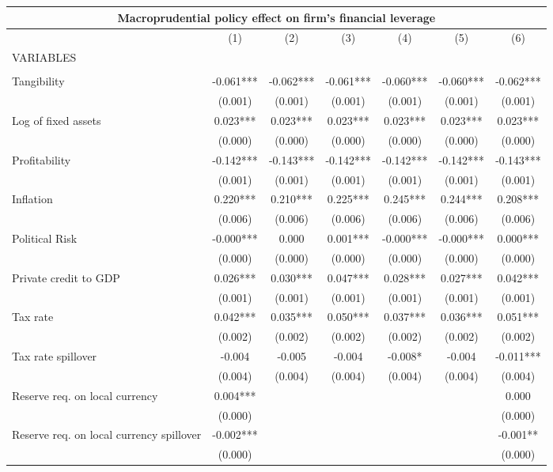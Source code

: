 \begin{tabular}{lcccccc}
\multicolumn{7}{c}{Macroprudential policy effect on firm's financial leverage} \\ \hline
 & (1) & (2) & (3) & (4) & (5) & (6) \\
VARIABLES &  &  &  &  &  &  \\ \hline
 &  &  &  &  &  &  \\
Tangibility & -0.061*** & -0.062*** & -0.061*** & -0.060*** & -0.060*** & -0.062*** \\
 & (0.001) & (0.001) & (0.001) & (0.001) & (0.001) & (0.001) \\
Log of fixed assets & 0.023*** & 0.023*** & 0.023*** & 0.023*** & 0.023*** & 0.023*** \\
 & (0.000) & (0.000) & (0.000) & (0.000) & (0.000) & (0.000) \\
Profitability & -0.142*** & -0.143*** & -0.142*** & -0.142*** & -0.142*** & -0.143*** \\
 & (0.001) & (0.001) & (0.001) & (0.001) & (0.001) & (0.001) \\
Inflation & 0.220*** & 0.210*** & 0.225*** & 0.245*** & 0.244*** & 0.208*** \\
 & (0.006) & (0.006) & (0.006) & (0.006) & (0.006) & (0.006) \\
Political Risk & -0.000*** & 0.000 & 0.001*** & -0.000*** & -0.000*** & 0.000*** \\
 & (0.000) & (0.000) & (0.000) & (0.000) & (0.000) & (0.000) \\
Private credit to GDP & 0.026*** & 0.030*** & 0.047*** & 0.028*** & 0.027*** & 0.042*** \\
 & (0.001) & (0.001) & (0.001) & (0.001) & (0.001) & (0.001) \\
Tax rate & 0.042*** & 0.035*** & 0.050*** & 0.037*** & 0.036*** & 0.051*** \\
 & (0.002) & (0.002) & (0.002) & (0.002) & (0.002) & (0.002) \\
Tax rate spillover & -0.004 & -0.005 & -0.004 & -0.008* & -0.004 & -0.011*** \\
 & (0.004) & (0.004) & (0.004) & (0.004) & (0.004) & (0.004) \\
Reserve req. on local currency & 0.004*** &  &  &  &  & 0.000 \\
 & (0.000) &  &  &  &  & (0.000) \\
Reserve req. on local currency spillover & -0.002*** &  &  &  &  & -0.001** \\
 & (0.000) &  &  &  &  & (0.000) \\

\end{tabular}
